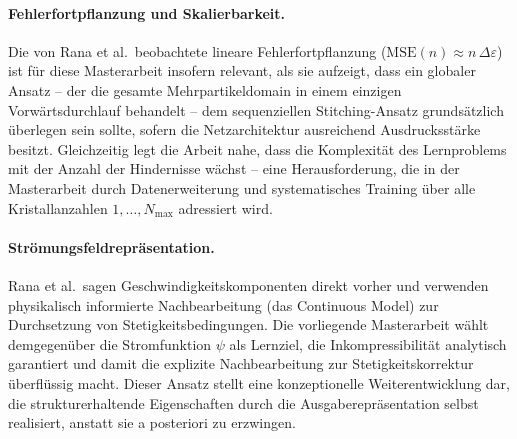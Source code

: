 \documentclass[a4paper,12pt]{article}
\begin{document}
\paragraph{Fehlerfortpflanzung und Skalierbarkeit.}
Die von Rana et al.\ beobachtete lineare Fehlerfortpflanzung ($\mathrm{MSE}(n) \approx n\,\Delta\varepsilon$)
ist für diese Masterarbeit insofern relevant, als sie aufzeigt, dass ein globaler Ansatz --
der die gesamte Mehrpartikeldomain in einem einzigen Vorwärtsdurchlauf behandelt -- dem
sequenziellen Stitching-Ansatz grundsätzlich überlegen sein sollte, sofern die Netzarchitektur
ausreichend Ausdrucksstärke besitzt. Gleichzeitig legt die Arbeit nahe, dass die Komplexität
des Lernproblems mit der Anzahl der Hindernisse wächst -- eine Herausforderung, die in
der Masterarbeit durch Datenerweiterung und systematisches Training über alle Kristallanzahlen
$1, \ldots, N_{\max}$ adressiert wird.

\paragraph{Strömungsfeldrepräsentation.}
Rana et al.\ sagen Geschwindigkeitskomponenten direkt vorher und verwenden
physikalisch informierte Nachbearbeitung (das Continuous Model) zur Durchsetzung von
Stetigkeitsbedingungen. Die vorliegende Masterarbeit wählt demgegenüber die Stromfunktion
$\psi$ als Lernziel, die Inkompressibilität analytisch garantiert und damit die explizite
Nachbearbeitung zur Stetigkeitskorrektur überflüssig macht. Dieser Ansatz stellt eine
konzeptionelle Weiterentwicklung dar, die strukturerhaltende Eigenschaften durch die
Ausgaberepräsentation selbst realisiert, anstatt sie a posteriori zu erzwingen.
\end{document}
